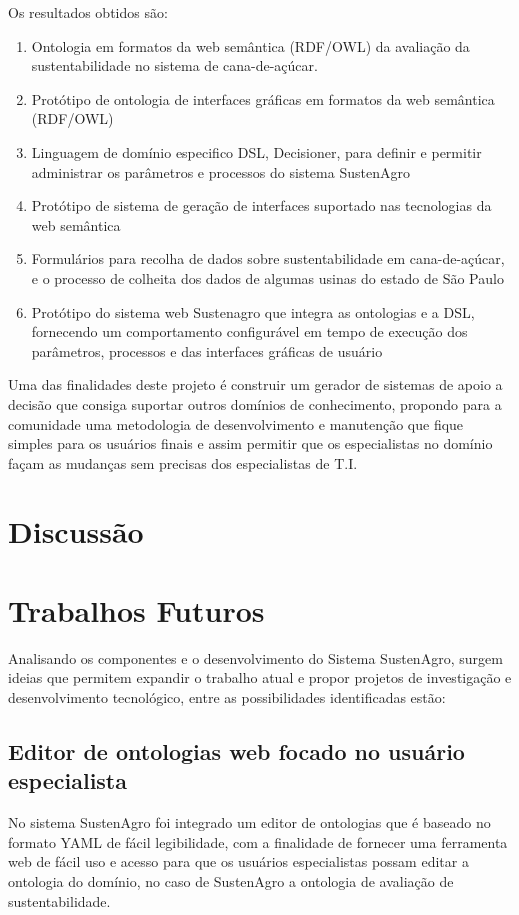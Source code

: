 Os resultados obtidos são: 
\begin{enumerate}
\item Ontologia em formatos da web semântica (RDF/OWL) da avaliação da sustentabilidade
no sistema de cana-de-açúcar. 
\item Protótipo de ontologia de interfaces gráficas em formatos da web semântica
(RDF/OWL) 
\item Linguagem de domínio especifico DSL, Decisioner, para definir e permitir
administrar os parâmetros e processos do sistema SustenAgro 
\item Protótipo de sistema de geração de interfaces suportado nas tecnologias
da web semântica 
\item Formulários para recolha de dados sobre sustentabilidade em cana-de-açúcar,
e o processo de colheita dos dados de algumas usinas do estado de
São Paulo 
\item Protótipo do sistema web Sustenagro que integra as ontologias e a
DSL, fornecendo um comportamento configurável em tempo de execução
dos parâmetros, processos e das interfaces gráficas de usuário
\end{enumerate}
Uma das finalidades deste projeto é construir um gerador de sistemas
de apoio a decisão que consiga suportar outros domínios de conhecimento,
propondo para a comunidade uma metodologia de desenvolvimento e manutenção
que fique simples para os usuários finais e assim permitir que os
especialistas no domínio façam as mudanças sem precisas dos especialistas
de T.I.

\section{Discussão}

\section{Trabalhos Futuros}

Analisando os componentes e o desenvolvimento do Sistema SustenAgro,
surgem ideias que permitem expandir o trabalho atual e propor projetos
de investigação e desenvolvimento tecnológico, entre as possibilidades
identificadas estão:

\subsection{Editor de ontologias web focado no usuário especialista}

No sistema SustenAgro foi integrado um editor de ontologias que é
baseado no formato YAML de fácil legibilidade, com a finalidade de
fornecer uma ferramenta web de fácil uso e acesso para que os usuários
especialistas possam editar a ontologia do domínio, no caso de SustenAgro
a ontologia de avaliação de sustentabilidade.

